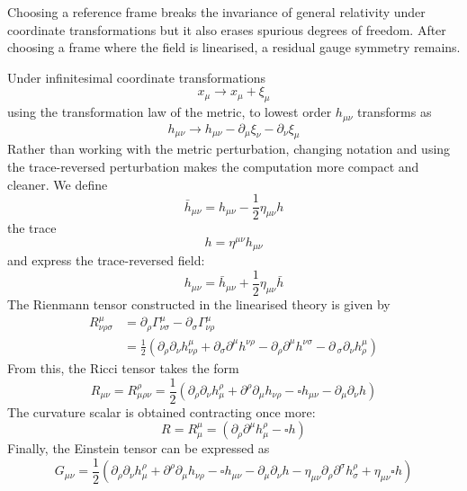 \documentclass[binding=0.6cm, LaM]{sapthesis}
\begin{document}
	Choosing a reference frame breaks the invariance of general relativity under 
	coordinate transformations but it also erases spurious degrees of freedom. 
	After choosing a frame where the field is linearised, 
	a residual gauge symmetry remains.

	Under infinitesimal coordinate transformations
                 \[
			x_{\mu} \rightarrow x_{\mu} + \xi_{\mu}
                \]
	using the transformation law of the metric, to lowest order $h_{\mu\nu}$ transforms as	
		\[
			h_{\mu\nu} \rightarrow h_{\mu\nu} - \partial_{\mu}\xi_{\nu} - \partial_{\nu}\xi_{\mu}
		\]
	Rather than working with the metric perturbation, changing notation and using the trace-reversed perturbation 
	makes the computation more compact and cleaner. We define
		\begin{equation}
			{\bar h}_{\mu\nu} = h_{\mu\nu} - \frac{1}{2}\eta_{\mu\nu}h  
		\end{equation}
	the trace
		\begin{equation}
			h = \eta^{\mu\nu}h_{\mu\nu}
		\end{equation}
	and express the trace-reversed field:
		\begin{equation}
			h_{\mu\nu} = {\bar h}_{\mu\nu} + \frac{1}{2}\eta_{\mu\nu}{\bar h}
		\end{equation}
	The Rienmann tensor constructed in the linearised theory is given by
		\begin{align}
			R^{\mu}_{\nu\rho\sigma} &= \partial_{\rho} \Gamma^{\mu}_{\nu\sigma} - \partial_{\sigma}\Gamma^{\mu}_{\nu\rho}  \\
				       &= \frac{1}{2} (\partial_{\rho}\partial_{\nu}h^{\mu}_{\nu\rho} + \partial_{\sigma}\partial^{\mu}h^{\nu\rho} - \partial_{\rho}\partial^{\mu}h^{\nu\sigma} - \partial_{\					     \sigma}\partial_{\nu}h^{\mu}_{\rho})
		\end{align}
	From this, the Ricci tensor takes the form
		\begin{equation}
			R_{\mu\nu} = R^{\rho}_{\mu\rho\nu} = \frac{1}{2}(\partial_{\rho}\partial_{\nu}h^{\rho}_{\mu} + \partial^{\rho}\partial_{\mu}h_{\nu\rho} - \square h_{\mu\nu} - \partial_{\mu}\partial_{\nu}h)
		\end{equation}
	The curvature scalar is obtained contracting once more:
		\begin{equation}
			R = R^{\mu}_{\mu} = (\partial_{\rho}\partial^{\mu}h^{\rho}_{\mu} - \square h)
		\end{equation}
	Finally, the Einstein tensor can be expressed as
		\begin{equation}
			G_{\mu\nu} = \frac{1}{2}(\partial_{\rho}\partial_{\nu}h^{\rho}_{\mu} + \partial^{\rho}\partial_{\mu}h_{\nu\rho} - \square h_{\mu\nu} - \partial_{\mu}\partial_{\nu}h - \eta_{\mu\nu}\partial_{\rho}\partial^{\sigma}h^{\rho}_{\sigma} + \eta_{\mu\nu}\square h)
		\end{equation}
\end{document}
